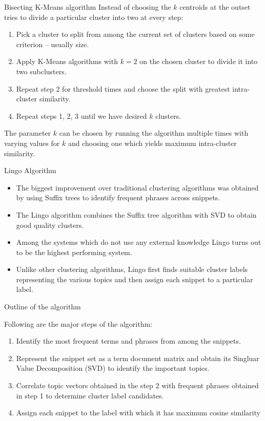 \documentclass{beamer}
\begin{document}
\begin{frame}{Bisecting K-Means algorithm}
Instead of choosing the $k$ centroids at the outset tries to divide a
particular cluster into two at every step:
\begin{enumerate}
  \item Pick a cluster to split from among the current set of clusters
    based on some criterion -- usually size.
  \item Apply K-Means algorithms with $k = 2$ on the chosen cluster to
    divide it into two subclusters.
  \item Repeat step 2 for threshold times and choose the split with
    greatest intra-cluster similarity.
  \item Repeat steps 1, 2, 3 until we have desired $k$ clusters.
\end{enumerate}
The parameter $k$ can be chosen by running the algorithm multiple
times with varying values for $k$ and choosing one which yields
maximum intra-cluster similarity.
\end{frame}

\begin{frame}{Lingo Algorithm}
\begin{itemize}
  \item The biggest improvement over traditional clustering algorithms
    was obtained by using Suffix trees to identify frequent phrases
    across snippets. 
  \item The Lingo algorithm combines the Suffix tree algorithm with
    SVD to obtain good quality clusters.
  \item Among the systems which do not use any external knowledge
    Lingo turns out to be the highest performing system.
  \item Unlike other clustering algorithms, Lingo first finds suitable
    cluster labels representing the various topics and then assign
    each snippet to a particular label.
\end{itemize}
\end{frame}

\begin{frame}{Outline of the algorithm}

Following are the major steps of the algorithm:
\begin{enumerate}
  \item Identify the most frequent terms and phrases from among the
    snippets. 
  \item Represent the snippet set as a term document matrix and obtain
    its Singluar Value Decomposition (SVD) to identify the important
    topics. 
  \item Correlate topic vectors obtained in the step 2 with frequent
    phrases obtained in step 1 to determine cluster label candidates.
  \item Assign each snippet to the label with which it has maximum
    cosine similarity
\end{enumerate}
\end{frame}
\end{document}
